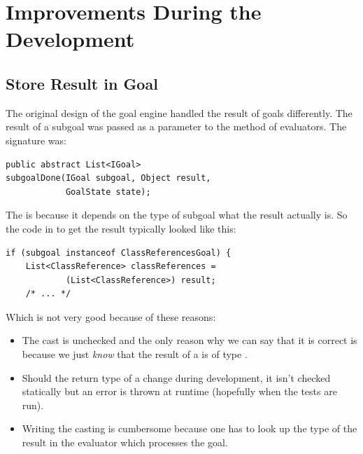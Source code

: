 \documentclass[12pt,halfparskip,DIV11,BCOR10mm]{scrreprt}
\begin{document}
\section{Improvements During the Development}


\subsection{Store Result in Goal}


The original design of the goal engine handled the result of goals differently. The result of a subgoal was passed as a parameter to the  method of evaluators. The signature was:

\begin{lstlisting}[style=java]
public abstract List<IGoal>
subgoalDone(IGoal subgoal, Object result,
            GoalState state);
\end{lstlisting}

The  is  because it depends on the type of subgoal what the result actually is. So the code in  to get the result typically looked like this:

\begin{lstlisting}[style=java]
if (subgoal instanceof ClassReferencesGoal) {
    List<ClassReference> classReferences =
            (List<ClassReference>) result;
    /* ... */
\end{lstlisting}

Which is not very good because of these reasons:

\begin{itemize}
    \item The cast is unchecked and the only reason why we can say that it is correct is because we just \emph{know} that the result of a  is of type .
    \item Should the return type of a  change during development, it isn't checked statically but an error is thrown at runtime (hopefully when the tests are run).
    \item Writing the casting is cumbersome because one has to look up the type of the result in the evaluator which processes the goal.
\end{itemize}
\end{document}
